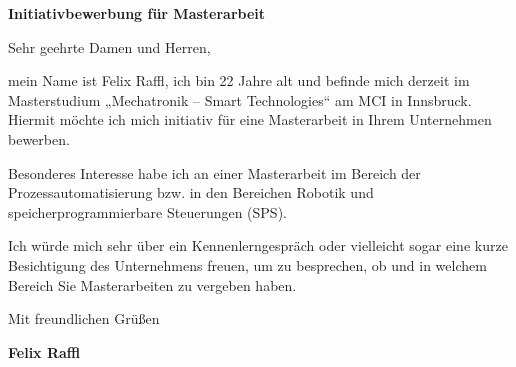 \documentclass[]{plushcv}
\begin{document}
		\vspace{2cm} %
		
		\textbf{\Large \color{primary} Initiativbewerbung für Masterarbeit}
		
		\vspace{1cm} %
		
		Sehr geehrte Damen und Herren,\\
		\vspace{0.3cm}
		
		mein Name ist Felix Raffl, ich bin 22 Jahre alt und befinde mich derzeit im Masterstudium „Mechatronik – Smart Technologies“ am MCI in Innsbruck. Hiermit möchte ich mich initiativ für eine Masterarbeit in Ihrem Unternehmen bewerben.\\
		\vspace{0.3cm}
		
		Besonderes Interesse habe ich an einer Masterarbeit im Bereich der Prozessautomatisierung bzw. in den Bereichen Robotik und speicherprogrammierbare Steuerungen (SPS).\\
		\vspace{0.3cm}
		
		Ich würde mich sehr über ein Kennenlerngespräch oder vielleicht sogar eine kurze Besichtigung des Unternehmens freuen, um zu besprechen, ob und in welchem Bereich Sie Masterarbeiten zu vergeben haben.\\
		\vspace{1cm}
		
		Mit freundlichen Grüßen\\
		\vspace{1.5cm} %
		
		\textbf{Felix Raffl}
		
	
\end{document}
